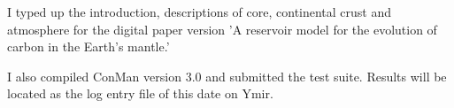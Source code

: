 I typed up the introduction, descriptions of core, continental crust and atmosphere for the digital paper version 'A reservoir model for the evolution of carbon in the Earth's mantle.'

I also compiled ConMan version 3.0 and submitted the test suite. Results will be located as the log entry file of this date on Ymir. 
